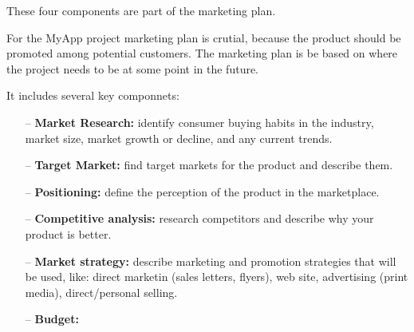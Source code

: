 These four components are part of the marketing plan.

For the MyApp project marketing plan is crutial, because the product should be promoted among potential customers. The marketing plan is be based on where the project needs to be at some point in the future.

It includes several key componnets: 
\begin{enumerate}

\item[--] \textbf{Market Research:} identify consumer buying habits in the industry, market size, market growth or decline, and any current trends.

\item[--] \textbf{Target Market:} find target markets for the product and describe them.

\item[--] \textbf{Positioning:} define the perception of the product in the marketplace.

\item[--] \textbf{Competitive analysis:} research competitors and describe why your product is better.

\item[--] \textbf{Market strategy:} describe marketing and promotion strategies that will be used, like: direct marketin (sales letters, flyers), web site, advertising (print media), direct/personal selling.

\item[--] \textbf{Budget:} 



\end{enumerate}

















